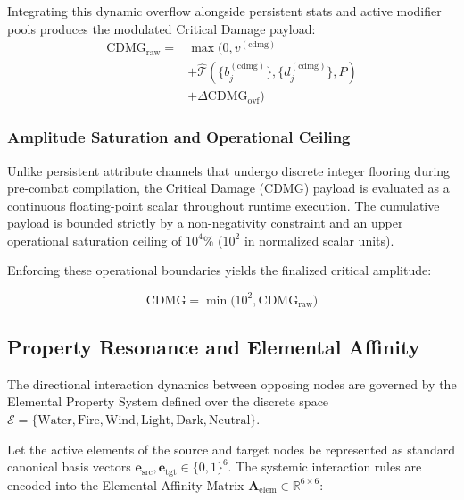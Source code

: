 \documentclass[twocolumn,10pt]{article}
\begin{document}
Integrating this dynamic overflow alongside persistent stats and active modifier pools produces the modulated Critical Damage payload:
\begin{equation}
\label{eq:cdmg_prefinal_1}
\begin{aligned}
  \text{CDMG}_{\text{raw}}  = {}& \max\Big(0, v^{(\text{cdmg})} \\
  &+ \hat{\mathcal{T}}\left( \{b_j^{(\text{cdmg})}\}, \{d_j^{(\text{cdmg})}\}, P \right) \\
  &+ \Delta \text{CDMG}_{\text{ovf}}\Big)
\end{aligned}
\end{equation}

\subsubsection{Amplitude Saturation and Operational Ceiling}

Unlike persistent attribute channels that undergo discrete integer flooring during pre-combat compilation, the Critical Damage ($\text{CDMG}$) payload is evaluated as a continuous floating-point scalar throughout runtime execution. The cumulative payload is bounded strictly by a non-negativity constraint and an upper operational saturation ceiling of $10^4\%$ ($10^2$ in normalized scalar units).

Enforcing these operational boundaries yields the finalized critical amplitude:

\begin{equation}
\label{eq:cdmg_final}
  \text{CDMG} = \min \Big(10^2, \text{CDMG}_{\text{raw}}\Big)
\end{equation}

\subsection{Property Resonance and Elemental Affinity}
\label{sec:elem_matrix}
The directional interaction dynamics between opposing nodes are governed by the Elemental Property System defined over the discrete space $\mathcal{E} = \{\text{Water}, \text{Fire}, \text{Wind}, \text{Light}, \text{Dark}, \text{Neutral}\}$.

Let the active elements of the source and target nodes be represented as standard canonical basis vectors $\mathbf{e}_{\text{src}}, \mathbf{e}_{\text{tgt}} \in \{0, 1\}^6$. The systemic interaction rules are encoded into the Elemental Affinity Matrix $\mathbf{A}_{\text{elem}} \in \mathbb{R}^{6 \times 6}$:
\end{document}
